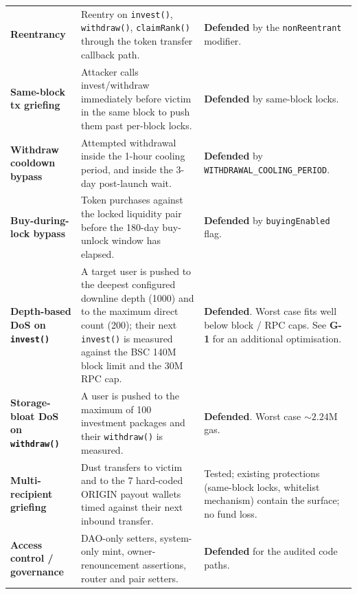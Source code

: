 \documentclass[11pt,a4paper]{article}
\begin{document}
\begin{center}
\begin{longtable}{>{\bfseries}p{4.8cm} p{6.1cm} p{3.5cm}}
Reentrancy
  & Reentry on \texttt{invest()}, \texttt{withdraw()}, \texttt{claimRank()}
    through the token transfer callback path.
  & \textcolor{passgreen}{\textbf{Defended}} by the \texttt{nonReentrant}
    modifier. \\

Same-block tx griefing
  & Attacker calls invest/withdraw immediately before victim in the same
    block to push them past per-block locks.
  & \textcolor{passgreen}{\textbf{Defended}} by same-block locks. \\

Withdraw cooldown bypass
  & Attempted withdrawal inside the 1-hour cooling period, and inside the
    3-day post-launch wait.
  & \textcolor{passgreen}{\textbf{Defended}} by
    \texttt{WITHDRAWAL\_COOLING\_PERIOD}. \\

Buy-during-lock bypass
  & Token purchases against the locked liquidity pair before the
    180-day buy-unlock window has elapsed.
  & \textcolor{passgreen}{\textbf{Defended}} by \texttt{buyingEnabled} flag. \\

Depth-based DoS on \texttt{invest()}
  & A target user is pushed to the deepest configured downline depth
    (1000) and to the maximum direct count (200); their next
    \texttt{invest()} is measured against the BSC 140M block limit and
    the 30M RPC cap.
  & \textcolor{passgreen}{\textbf{Defended}.} Worst case fits well below
    block / RPC caps. See \textbf{G-1} for an additional optimisation. \\

Storage-bloat DoS on \texttt{withdraw()}
  & A user is pushed to the maximum of 100 investment packages and their
    \texttt{withdraw()} is measured.
  & \textcolor{passgreen}{\textbf{Defended}.} Worst case ${\sim}2.24$M gas. \\

Multi-recipient griefing
  & Dust transfers to victim and to the 7 hard-coded ORIGIN payout wallets
    timed against their next inbound transfer.
  & Tested; existing protections (same-block locks, whitelist mechanism)
    contain the surface; no fund loss. \\

Access control / governance
  & DAO-only setters, system-only mint, owner-renouncement assertions,
    router and pair setters.
  & \textcolor{passgreen}{\textbf{Defended}} for the audited code paths. \\

\bottomrule
\end{longtable}
\end{center}
\end{document}
